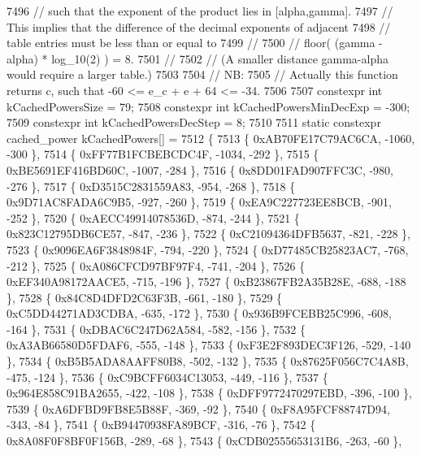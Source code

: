 \begin{DoxyCode}
7496     \textcolor{comment}{// such that the exponent of the product lies in [alpha,gamma].}
7497     \textcolor{comment}{// This implies that the difference of the decimal exponents of adjacent}
7498     \textcolor{comment}{// table entries must be less than or equal to}
7499     \textcolor{comment}{//}
7500     \textcolor{comment}{//      floor( (gamma - alpha) * log\_10(2) ) = 8.}
7501     \textcolor{comment}{//}
7502     \textcolor{comment}{// (A smaller distance gamma-alpha would require a larger table.)}
7503 
7504     \textcolor{comment}{// NB:}
7505     \textcolor{comment}{// Actually this function returns c, such that -60 <= e\_c + e + 64 <= -34.}
7506 
7507     constexpr \textcolor{keywordtype}{int} kCachedPowersSize = 79;
7508     constexpr \textcolor{keywordtype}{int} kCachedPowersMinDecExp = -300;
7509     constexpr \textcolor{keywordtype}{int} kCachedPowersDecStep = 8;
7510 
7511     \textcolor{keyword}{static} constexpr cached\_power kCachedPowers[] =
7512     \{
7513         \{ 0xAB70FE17C79AC6CA, -1060, -300 \},
7514         \{ 0xFF77B1FCBEBCDC4F, -1034, -292 \},
7515         \{ 0xBE5691EF416BD60C, -1007, -284 \},
7516         \{ 0x8DD01FAD907FFC3C,  -980, -276 \},
7517         \{ 0xD3515C2831559A83,  -954, -268 \},
7518         \{ 0x9D71AC8FADA6C9B5,  -927, -260 \},
7519         \{ 0xEA9C227723EE8BCB,  -901, -252 \},
7520         \{ 0xAECC49914078536D,  -874, -244 \},
7521         \{ 0x823C12795DB6CE57,  -847, -236 \},
7522         \{ 0xC21094364DFB5637,  -821, -228 \},
7523         \{ 0x9096EA6F3848984F,  -794, -220 \},
7524         \{ 0xD77485CB25823AC7,  -768, -212 \},
7525         \{ 0xA086CFCD97BF97F4,  -741, -204 \},
7526         \{ 0xEF340A98172AACE5,  -715, -196 \},
7527         \{ 0xB23867FB2A35B28E,  -688, -188 \},
7528         \{ 0x84C8D4DFD2C63F3B,  -661, -180 \},
7529         \{ 0xC5DD44271AD3CDBA,  -635, -172 \},
7530         \{ 0x936B9FCEBB25C996,  -608, -164 \},
7531         \{ 0xDBAC6C247D62A584,  -582, -156 \},
7532         \{ 0xA3AB66580D5FDAF6,  -555, -148 \},
7533         \{ 0xF3E2F893DEC3F126,  -529, -140 \},
7534         \{ 0xB5B5ADA8AAFF80B8,  -502, -132 \},
7535         \{ 0x87625F056C7C4A8B,  -475, -124 \},
7536         \{ 0xC9BCFF6034C13053,  -449, -116 \},
7537         \{ 0x964E858C91BA2655,  -422, -108 \},
7538         \{ 0xDFF9772470297EBD,  -396, -100 \},
7539         \{ 0xA6DFBD9FB8E5B88F,  -369,  -92 \},
7540         \{ 0xF8A95FCF88747D94,  -343,  -84 \},
7541         \{ 0xB94470938FA89BCF,  -316,  -76 \},
7542         \{ 0x8A08F0F8BF0F156B,  -289,  -68 \},
7543         \{ 0xCDB02555653131B6,  -263,  -60 \},

\end{DoxyCode}
